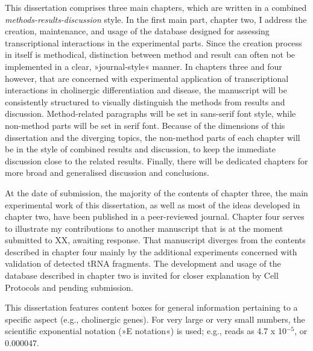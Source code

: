 
This dissertation comprises three main chapters, which are written in a combined \emph{methods-results-discussion} style. In the first main part, chapter two, I address the creation, maintenance, and usage of the database designed for assessing transcriptional interactions in the experimental parts. Since the creation process in itself is methodical, distinction between method and result can often not be implemented in a clear, »journal-style« manner. In chapters three and four however, that are concerned with experimental application of transcriptional interactions in cholinergic differentiation and disease, the manuscript will be consistently structured to visually distinguish the methods from results and discussion. Method-related paragraphs will be set in sans-serif font style, while non-method parts will be set in serif font. Because of the dimensions of this dissertation and the diverging topics, the non-method parts of each chapter will be in the style of combined results and discussion, to keep the immediate discussion close to the related results. Finally, there will be dedicated chapters for more broad and generalised discussion and conclusions.

At the date of submission, the majority of the contents of chapter three, the main experimental work of this dissertation, as well as most of the ideas developed in chapter two, have been published in a peer-reviewed journal.\cite{Lobentanzer2019a} Chapter four serves to illustrate my contributions to another manuscript that is at the moment submitted to XX, awaiting response.\cite{Winek2020} That manuscript diverges from the contents described in chapter four mainly by the additional experiments concerned with validation of detected tRNA fragments. The development and usage of the database described in chapter two is invited for closer explanation by Cell Protocols and pending submission.\cite{Lobentanzer2020}

This dissertation features content boxes for general information pertaining to a specific aspect (e.g., cholinergic genes). For very large or very small numbers, the scientific exponential notation (»E notation«) is used; e.g.,  reads as 4.7 x 10$^{-5}$, or 0.000047.
